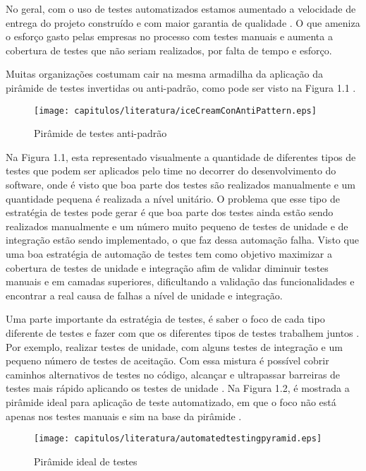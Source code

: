 No geral, com o uso de testes automatizados estamos aumentado a velocidade de entrega do projeto construído e com maior garantia de qualidade \cite{James2012}. O que ameniza o esforço gasto pelas empresas no processo com testes manuais e aumenta a cobertura de testes que não seriam realizados, por falta de tempo e esforço.

Muitas organizações costumam cair na mesma armadilha da aplicação da pirâmide de testes invertidas ou anti-padrão, como pode ser visto na Figura 1.1 \cite{WatirMelon2012}.

\begin{figure}[H]
	\centering
	\captionsetup{justification=centering,margin=2cm}
	\texttt{[image: capitulos/literatura/iceCreamConAntiPattern.eps]}
	\caption{Pirâmide de testes anti-padrão}
	\label{fig:iceCreamConAntiPattern}
\end{figure}

Na Figura 1.1, esta representado visualmente a quantidade de diferentes tipos de testes que podem ser aplicados pelo time no decorrer do desenvolvimento do software, onde é visto que boa parte dos testes são realizados manualmente e um quantidade pequena é realizada a nível unitário. O problema que esse tipo de estratégia de testes pode gerar é que boa parte dos testes ainda estão sendo realizados manualmente e um número muito pequeno de testes de unidade e de integração estão sendo implementado, o que faz dessa automação falha. Visto que uma boa estratégia de automação de testes tem como objetivo maximizar a cobertura de testes de unidade e integração afim de validar diminuir testes manuais e em camadas superiores, dificultando a validação das funcionalidades e encontrar a real causa de falhas a nível de unidade e integração. 

Uma parte importante  da estratégia de testes, é  saber o foco de cada tipo diferente de testes e fazer com que os diferentes tipos de testes trabalhem juntos \cite{James2012}. Por exemplo, realizar testes de unidade, com alguns testes de integração e um pequeno número de testes de aceitação. Com essa mistura é possível cobrir caminhos alternativos de testes no código, alcançar e ultrapassar barreiras de testes mais rápido aplicando os testes de unidade \cite{James2012}. Na Figura 1.2,  é mostrada a pirâmide ideal para aplicação de teste automatizado, em que o foco não está apenas nos testes manuais e sim na base da pirâmide \cite{James2011}.

\begin{figure}[H]
	\centering
	\captionsetup{justification=centering,margin=2cm}
	\texttt{[image: capitulos/literatura/automatedtestingpyramid.eps]}
	\caption{Pirâmide ideal de testes}
	\label{fig:automatedtestingpyramid}
\end{figure}

